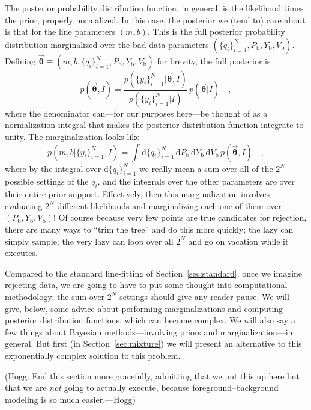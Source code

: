 \documentclass[12pt,twoside]{article}
\newcommand{\sectionname}{Section}
\newcounter{problem}
\newcommand{\mmatrix}[1]{\boldsymbol{#1}}
\newcommand{\parametervector}[1]{\mmatrix{\vec{#1}}}
\newcommand{\pvtheta}{\parametervector{\theta}}
\newcommand{\setofall}[3]{\{{#1}\}_{{#2}}^{{#3}}}
\newcommand{\allq}{\setofall{q_i}{i=1}{N}}
\newcommand{\ally}{\setofall{y_i}{i=1}{N}}
\renewcommand{\d}{\mathrm{d}}
\newcommand{\Pbad}{P_{\mathrm{b}}}
\newcommand{\Ybad}{Y_{\mathrm{b}}}
\newcommand{\Vbad}{V_{\mathrm{b}}}
\begin{document}
The posterior probability distribution function, in general, is the
likelihood times the prior, properly normalized.  In this case, the
posterior we (tend to) care about is that for the line parameters
$(m,b)$.  This is the full posterior probability distribution
marginalized over the bad-data parameters $(\allq,\Pbad,\Ybad,\Vbad)$.
Defining $\pvtheta\equiv(m,b,\allq,\Pbad,\Ybad,\Vbad)$ for brevity, the
full posterior is
\begin{equation}
p(\pvtheta,I) =
 \frac{p(\ally|\pvtheta,I)}{p(\ally|I)}
 \,p(\pvtheta|I)
 \quad,
\end{equation}
where the denominator can---for our purposes here---be thought of as a
normalization integral that makes the posterior distribution function
integrate to unity.  The marginalization looks like
\begin{equation}
p(m,b|\ally,I)=\int \d\allq\,\d\Pbad\,\d\Ybad\,\d\Vbad
 \,p(\pvtheta,I) \quad,
\end{equation}
where by the integral over $\d\allq$ we really mean a sum over all of
the $2^N$ possible settings of the $q_i$, and the integrals over the
other parameters are over their entire prior support.  Effectively,
then this marginalization involves evaluating $2^N$ different
likelihoods and marginalizing each one of them over
$(\Pbad,\Ybad,\Vbad)$!  Of course because very few points are true
candidates for rejection, there are many ways to ``trim the tree'' and
do this more quickly; the lazy can simply sample; the very lazy can
loop over all $2^N$ and go on vacation while it executes.
  
Compared to the standard line-fitting of
\sectionname~\ref{sec:standard}, once we imagine rejecting data, we
are going to have to put some thought into computational methodology;
the sum over $2^N$ settings should give any reader pause.  We will
give, below, some advice about performing marginalizations and
computing posterior distribution functions, which can become complex.
We will also say a few things about Bayesian methods---involving
priors and marginalization---in general.  But first (in
\sectionname~\ref{sec:mixture}) we will present an alternative to this
exponentially complex solution to this problem.

(Hogg: End this section more gracefully, admitting that we put this up
here but that we are \emph{not} going to actually execute, because
foreground--background modeling is so much easier.---Hogg)
\end{document}
